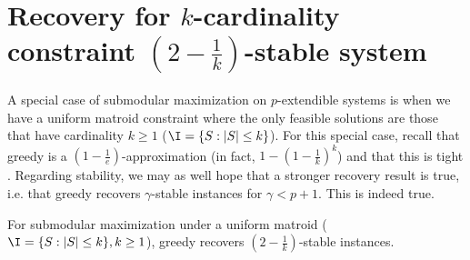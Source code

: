 \section{Recovery for $k$-cardinality constraint $(2-\tfrac{1}{k})$-stable system}
A special case of submodular maximization on $p$-extendible systems is when we have a uniform matroid constraint where the only feasible solutions are those that have cardinality $k \ge 1$ ($\I=\{S: |S|\le k\}$). For this special case, recall that greedy is a $(1-\tfrac{1}{e})$-approximation (in fact, $1-(1-\tfrac{1}{k})^k$) and that this is tight \cite{feige1998threshold}. Regarding stability, we may as well hope that a stronger recovery result is true, i.e. that greedy recovers $\gamma$-stable instances for $\gamma<p+1$. This is indeed true.

\begin{theorem}
For submodular maximization under a uniform matroid ($\I=\{S: |S|\le k\},k\ge 1$), greedy recovers $(2-\tfrac{1}{k})$-stable instances.
\end{theorem}

